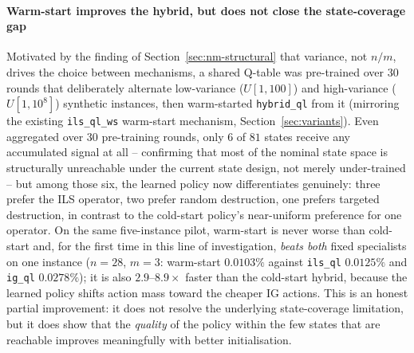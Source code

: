\documentclass[final,3p,times,11pt,authoryear]{elsarticle}
\begin{document}
\paragraph{Warm-start improves the hybrid, but does not close the state-coverage gap}
Motivated by the finding of Section~\ref{sec:nm-structural} that
variance, not $n/m$, drives the choice between mechanisms, a shared
Q-table was pre-trained over $30$ rounds that deliberately
alternate low-variance ($U[1,100]$) and high-variance ($U[1,10^8]$)
synthetic instances, then warm-started \texttt{hybrid\_ql} from it
(mirroring the existing \texttt{ils\_ql\_ws} warm-start mechanism,
Section~\ref{sec:variants}). Even aggregated over $30$ pre-training
rounds, only $6$ of $81$ states receive any accumulated signal at
all -- confirming that most of the nominal state space is structurally
unreachable under the current state design, not merely under-trained
-- but among those six, the learned policy now differentiates
genuinely: three prefer the ILS operator, two prefer random
destruction, one prefers targeted destruction, in contrast to the
cold-start policy's near-uniform preference for one operator. On the
same five-instance pilot, warm-start is never worse than cold-start
and, for the first time in this line of investigation, \emph{beats
both} fixed specialists on one instance ($n=28$, $m=3$: warm-start
$0.0103\%$ against \texttt{ils\_ql} $0.0125\%$ and \texttt{ig\_ql}
$0.0278\%$); it is also $2.9$--$8.9\times$ faster than the cold-start
hybrid, because the learned policy shifts action mass toward the
cheaper IG actions. This is an honest partial improvement: it does
not resolve the underlying state-coverage limitation, but it does
show that the \emph{quality} of the policy within the few states that
are reachable improves meaningfully with better initialisation.
\end{document}
